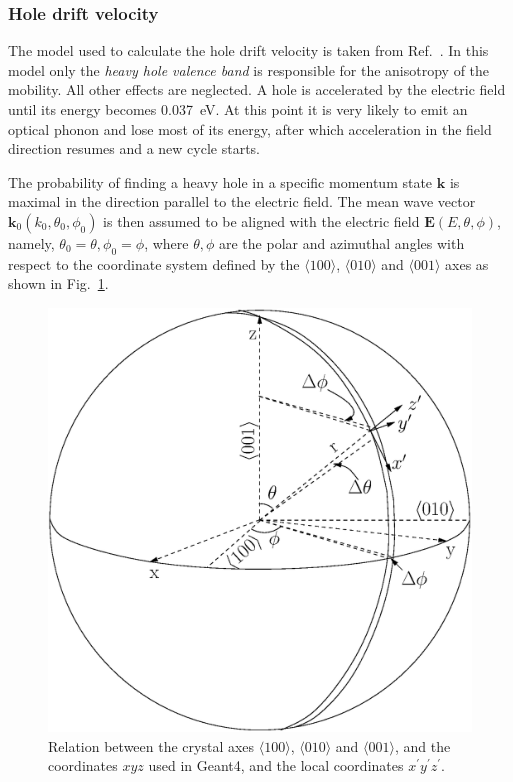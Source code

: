 \documentclass[epj]{svjour}
\begin{document}
\subsubsection{Hole drift velocity} 
\label{s:hole} 
The model used to calculate the hole drift velocity is taken from
Ref.~\cite{bart}. In this model only the \emph{heavy hole valence
band} is responsible for the anisotropy of the mobility. All other
effects are neglected. A hole is accelerated by the electric field
until its energy becomes 0.037~eV. At this point it is very likely to
emit an optical phonon and lose most of its energy, after which
acceleration in the field direction resumes and a new cycle starts.
 
The probability of finding a heavy hole in a specific momentum state
$\mathbf{k}$ is maximal in the direction parallel to the electric
field. The mean wave vector $\mathbf{k}_{0}(k_{0}, \theta_{0},
\phi_{0})$ is then assumed to be aligned with the electric field
$\mathbf{E}(E, \theta, \phi)$, namely, $\theta_{0} = \theta,
\phi_{0} = \phi$, where $\theta, \phi$ are the polar and azimuthal
angles with respect to the coordinate system defined by the $\langle
100 \rangle$, $\langle 010 \rangle$ and $\langle 001 \rangle$ axes as
shown in Fig.~\ref{f:vsphere}.
 
\begin{figure}\centering
\includegraphics[width=0.8\linewidth]{vsphere}   
\caption{Relation between the crystal axes $\langle100\rangle$,
$\langle010\rangle$ and $\langle001\rangle$, and the coordinates $xyz$
used in Geant4, and the local coordinates
$x^{\prime}y^{\prime}z^{\prime}$.}
\label{f:vsphere} 
\end{figure} 
 
\end{document}
